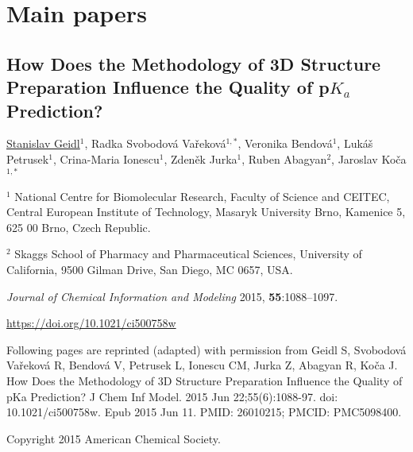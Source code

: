 \chapter{Main papers}
\label{chapter:papers}

\clearpage

\begin{center}
\section{\centering How Does the Methodology of 3D Structure
Preparation Influence the Quality of p$K_a$ Prediction?}
    
\underline{Stanislav Geidl$^1$}, Radka Svobodová Vařeková$^{1, *}$,
Veronika Bendová$^1$, Lukáš Petrusek$^1$, Crina-Maria Ionescu$^1$,
Zdeněk Jurka$^1$, Ruben Abagyan$^2$, Jaroslav Koča$^{1, *}$

\vspace{1cm}

$^1$ National Centre for Biomolecular Research, Faculty of Science and CEITEC,
Central European Institute of Technology, Masaryk University Brno, Kamenice 5,
625 00 Brno, Czech Republic.

$^2$ Skaggs School of Pharmacy and Pharmaceutical Sciences, University of
California, 9500 Gilman Drive, San Diego, MC 0657, USA.

\vspace{1cm}

\textit{Journal of Chemical Information and  Modeling} 2015, \textbf{55}:1088–1097.

\vspace{1cm}

\url{https://doi.org/10.1021/ci500758w}

\vspace{1cm}

Following pages are reprinted (adapted) with permission from 
Geidl S, Svobodová Vařeková R, Bendová V, Petrusek L, Ionescu CM,
Jurka Z, Abagyan R, Koča J. How Does the Methodology of 3D Structure
Preparation Influence the Quality of pKa Prediction? J Chem Inf Model.
2015 Jun 22;55(6):1088-97. doi: 10.1021/ci500758w. Epub 2015 Jun 11.
PMID: 26010215; PMCID: PMC5098400.

Copyright 2015 American Chemical Society.

\end{center}





